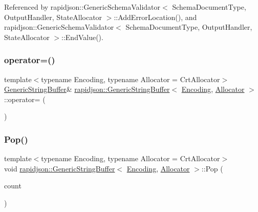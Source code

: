 Referenced by rapidjson\+::\+Generic\+Schema\+Validator$<$ Schema\+Document\+Type, Output\+Handler, State\+Allocator $>$\+::\+Add\+Error\+Location(), and rapidjson\+::\+Generic\+Schema\+Validator$<$ Schema\+Document\+Type, Output\+Handler, State\+Allocator $>$\+::\+End\+Value().

\mbox{\label{classrapidjson_1_1_generic_string_buffer_af183e859f15b23e59afe2cad176b81ed}} 
\subsubsection{\texorpdfstring{operator=()}{operator=()}}
{\footnotesize\ttfamily template$<$typename Encoding, typename Allocator = Crt\+Allocator$>$ \\
\mbox{\hyperlink{classrapidjson_1_1_generic_string_buffer}{Generic\+String\+Buffer}}\& \mbox{\hyperlink{classrapidjson_1_1_generic_string_buffer}{rapidjson\+::\+Generic\+String\+Buffer}}$<$ \mbox{\hyperlink{classrapidjson_1_1_encoding}{Encoding}}, \mbox{\hyperlink{classrapidjson_1_1_allocator}{Allocator}} $>$\+::operator= (\begin{DoxyParamCaption}\item[{const \mbox{\hyperlink{classrapidjson_1_1_generic_string_buffer}{Generic\+String\+Buffer}}$<$ \mbox{\hyperlink{classrapidjson_1_1_encoding}{Encoding}}, \mbox{\hyperlink{classrapidjson_1_1_allocator}{Allocator}} $>$ \&}]{ }\end{DoxyParamCaption})\hspace{0.3cm}{\ttfamily [private]}}

\mbox{\label{classrapidjson_1_1_generic_string_buffer_afb41bae09405ddd9aa9250ac47ab235e}} 
\subsubsection{\texorpdfstring{Pop()}{Pop()}}
{\footnotesize\ttfamily template$<$typename Encoding, typename Allocator = Crt\+Allocator$>$ \\
void \mbox{\hyperlink{classrapidjson_1_1_generic_string_buffer}{rapidjson\+::\+Generic\+String\+Buffer}}$<$ \mbox{\hyperlink{classrapidjson_1_1_encoding}{Encoding}}, \mbox{\hyperlink{classrapidjson_1_1_allocator}{Allocator}} $>$\+::Pop (\begin{DoxyParamCaption}\item[{size\+\_\+t}]{count }\end{DoxyParamCaption})}



